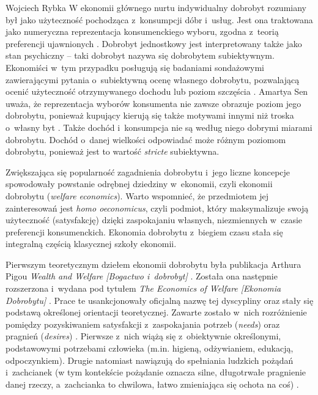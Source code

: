\begin{artplenv}{Wojciech Rybka}
W ekonomii głównego nurtu indywidualny dobrobyt rozumiany był jako użyteczność pochodząca z~konsumpcji dóbr i~usług.
Jest ona traktowana jako numeryczna reprezentacja konsumenckiego wyboru, zgodna z~teorią preferencji ujawnionych
\parencites{boehm_is_2002}{ostapiuk_droga_2019}.
Dobrobyt jednostkowy jest interpretowany także jako
stan psychiczny -- taki dobrobyt nazywa się dobrobytem subiektywnym. Ekonomiści w~tym przypadku posługują się badaniami
sondażowymi zawierającymi pytania o~subiektywną ocenę własnego dobrobytu, pozwalającą ocenić użyteczność otrzymywanego
dochodu
\parencite{kot_ekonometryczne_2000}
lub poziom szczęścia
\parencite{blanchflower_well-being_2004}.
Amartya Sen uważa, że reprezentacja wyborów konsumenta nie zawsze obrazuje poziom jego dobrobytu, ponieważ
kupujący kierują się także motywami innymi niż troska o~własny byt
\parencite{zaremba_dobrobyt_2016}.
Także
dochód i~konsumpcja nie są według niego dobrymi miarami dobrobytu. Dochód o~danej wielkości odpowiadać może różnym
poziomom dobrobytu, ponieważ jest to wartość \textit{stricte} subiektywna. 

Zwiększająca się popularność zagadnienia dobrobytu i~jego liczne koncepcje spowodowały powstanie odrębnej
dziedziny w~ekonomii, czyli ekonomii dobrobytu (\textit{welfare economics}). Warto wspomnieć,
że przedmiotem jej zainteresowań jest
\textit{homo oeconomicus}, czyli podmiot, który maksymalizuje swoją użyteczność (satysfakcję) dzięki zaspokajaniu
własnych, niezmiennych w~czasie preferencji konsumenckich. Ekonomia dobrobytu z~biegiem czasu stała się integralną
częścią klasycznej szkoły ekonomii. 

Pierwszym teoretycznym dziełem ekonomii dobrobytu była publikacja Arthura Pigou  \textit{Wealth and Welfare
[Bogactwo i~dobrobyt]}
\parencite*{pigou_wealth_1912}.
Została ona następnie rozszerzona i~wydana pod tytułem \textit{The
Economics of Welfare [Ekonomia Dobrobytu]}
\parencite*{pigou_economics_1920}.
Prace te usankcjonowały oficjalną nazwę tej
dyscypliny oraz stały się podstawą określonej orientacji teoretycznej. Zawarte zostało w~nich rozróżnienie pomiędzy
pozyskiwaniem satysfakcji z~zaspokajania potrzeb (\textit{needs}) oraz pragnień (\textit{desires})
\parencite{czech_ekonomia_2014}.
Pierwsze z~nich wiążą się z~obiektywnie określonymi, podstawowymi potrzebami
człowieka (m.in. higieną, odżywianiem, edukacją, odpoczynkiem). Drugie natomiast nawiązują do spełniania ludzkich
pożądań i~zachcianek (w tym kontekście pożądanie oznacza silne, długotrwałe pragnienie danej rzeczy, a~zachcianka to
chwilowa, łatwo zmieniająca się ochota na coś)
\parencite{czech_ekonomia_2014}.


\end{artplenv}
